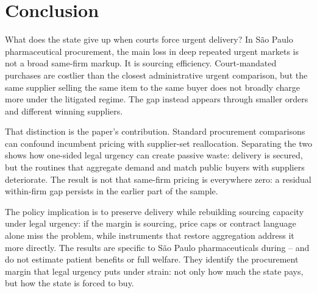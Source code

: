 \section{Conclusion}
\label{sec:conclusion}

What does the state give up when courts force urgent delivery? In S\~ao Paulo pharmaceutical procurement, the main loss in deep repeated urgent markets is not a broad same-firm markup. It is sourcing efficiency. Court-mandated purchases are costlier than the closest administrative urgent comparison, but the same supplier selling the same item to the same buyer does not broadly charge more under the litigated regime. The gap instead appears through smaller orders and different winning suppliers.

That distinction is the paper's contribution. Standard procurement comparisons can confound incumbent pricing with supplier-set reallocation. Separating the two shows how one-sided legal urgency can create passive waste: delivery is secured, but the routines that aggregate demand and match public buyers with suppliers deteriorate. The result is not that same-firm pricing is everywhere zero: a residual within-firm gap persists in the earlier part of the sample.

The policy implication is to preserve delivery while rebuilding sourcing capacity under legal urgency: if the margin is sourcing, price caps or contract language alone miss the problem, while instruments that restore aggregation address it more directly. The results are specific to S\~ao Paulo pharmaceuticals during \BPsampleStartYear--\BPsampleEndYear{} and do not estimate patient benefits or full welfare. They identify the procurement margin that legal urgency puts under strain: not only how much the state pays, but how the state is forced to buy.
